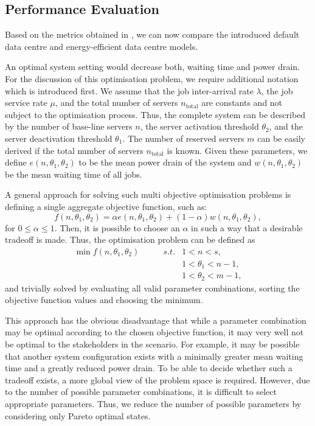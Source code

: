 \subsection{Performance Evaluation}\label{sec:cloud:data_centers:performance_evaluation}
Based on the metrics obtained in , we can now compare the introduced default data centre and energy-efficient data centre models.

An optimal system setting would decrease both, waiting time and power drain.
For the discussion of this optimisation problem, we require additional notation which is introduced first.
We assume that the job inter-arrival rate \(\lambda\), the job service rate \(\mu\), and the total number of servers \(n_\text{total}\) are constants and not subject to the optimisation process.
Thus, the complete system can be described by the number of base-line servers \(n\), the server activation threshold \(\theta_2\), and the server deactivation threshold \(\theta_1\).
The number of reserved servers \(m\) can be easily derived if the total number of servers \(n_\text{total}\) is known.
Given these parameters, we define \(e(n, \theta_1, \theta_2)\) to be the mean power drain of the system and \(w(n, \theta_1, \theta_2)\) be the mean waiting time of all jobs.

A general approach for solving such multi objective optimisation problems is defining a single aggregate objective function, such as:
\begin{equation}
f(n, \theta_1, \theta_2) = \alpha e(n, \theta_1, \theta_2)  + (1-\alpha) w(n, \theta_1, \theta_2),
\end{equation}
for \(0\leq\alpha\leq 1\).
Then, it is possible to choose an \(\alpha\) in such a way that a desirable tradeoff is made. Thus, the optimisation problem can be defined as
\begin{align}
\min f(n, \theta_1, \theta_2) \qquad&s.t.& 1 < n < s,\\ 
&&1 < \theta_1 < n - 1,\nonumber\\
&&1 < \theta_2 < m - 1\nonumber,
\end{align}
and trivially solved by evaluating all valid parameter combinations, sorting the objective function values and choosing the minimum.

This approach has the obvious disadvantage that while a parameter combination may be optimal according to the chosen objective function, it may very well not be optimal to the stakeholders in the scenario.
For example, it may be possible that another system configuration exists with a minimally greater mean waiting time and a greatly reduced power drain.
To be able to decide whether such a tradeoff exists, a more global view of the problem space is required.
However, due to the number of possible parameter combinations, it is difficult to select appropriate parameters.
Thus, we reduce the number of possible parameters by considering only Pareto optimal states.

